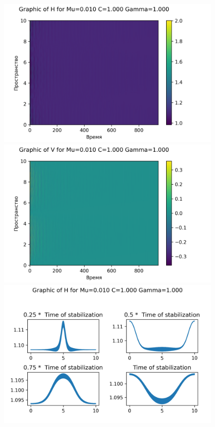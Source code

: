 \begin{figure}[H]
	\centering
	\includegraphics[scale=0.5]{../graphs_data_nonsmooth_1/value/Graph_H_mu0.010_C1.000_gamma1.000.png}
	\includegraphics[scale=0.5]{../graphs_data_nonsmooth_1/value/Graph_V_mu0.010_C1.000_gamma1.000.png}	
	\includegraphics[scale=0.5]{../graphs_data_nonsmooth_1/slices/Graph_H_mu0.010_C1.000_gamma1.000.png}

\end{figure}
